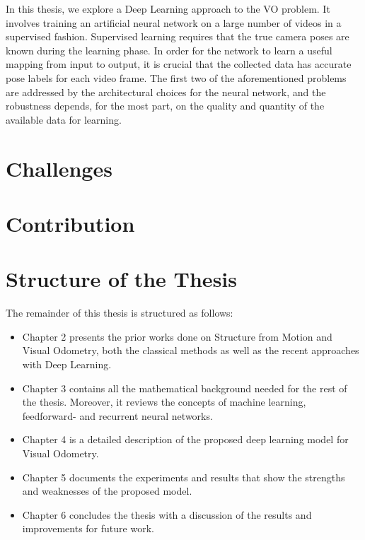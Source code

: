 		In this thesis, we explore a Deep Learning approach to the VO problem.
		It involves training an artificial neural network on a large number of videos in a supervised fashion.
		Supervised learning requires that the true camera poses are known during the learning phase.%
		In order for the network to learn a useful mapping from input to output, it is crucial that the collected data has accurate pose labels for each video frame.
		The first two of the aforementioned problems are addressed by the architectural choices for the neural network, and the robustness depends, for the most part, on the quality and quantity of the available data for learning.
		
		
	\section{Challenges}
		
	
	\section{Contribution}
	
	\section{Structure of the Thesis}
		The remainder of this thesis is structured as follows:
		\begin{itemize}
			\item Chapter 2 presents the prior works done on Structure from Motion and Visual Odometry, both the classical methods as well as the recent approaches with Deep Learning.
			
			\item Chapter 3 contains all the mathematical background needed for the rest of the thesis.
			Moreover, it reviews the concepts of machine learning, feedforward- and recurrent neural networks.
			
			\item Chapter 4 is a detailed description of the proposed deep learning model for Visual Odometry.
			
			\item Chapter 5 documents the experiments and results that show the strengths and weaknesses of the proposed model.
			
			\item Chapter 6 concludes the thesis with a discussion of the results and improvements for future work.
		\end{itemize}
